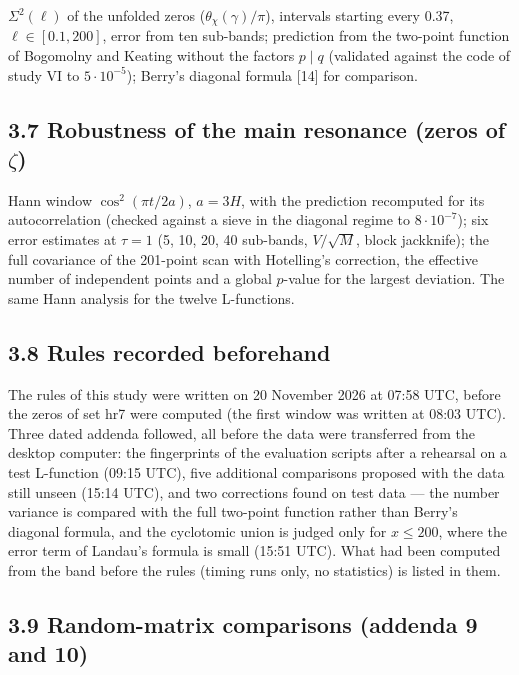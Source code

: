\documentclass[
  10pt,
]{article}
\begin{document}
\(\Sigma^2(\ell)\) of the unfolded zeros (\(\theta_\chi(\gamma)/\pi\)),
intervals starting every 0.37, \(\ell \in [0.1, 200]\), error from ten
sub-bands; prediction from the two-point function of Bogomolny and
Keating without the factors \(p \mid q\) (validated against the code of
study VI to \(5\cdot10^{-5}\)); Berry's diagonal formula {[}14{]} for
comparison.

\hypertarget{robustness-of-the-main-resonance-zeros-of-zeta}{%
\subsection{\texorpdfstring{3.7 Robustness of the main resonance (zeros
of
\(\zeta\))}{3.7 Robustness of the main resonance (zeros of \textbackslash zeta)}}\label{robustness-of-the-main-resonance-zeros-of-zeta}}

Hann window \(\cos^2(\pi t/2a)\), \(a = 3H\), with the prediction
recomputed for its autocorrelation (checked against a sieve in the
diagonal regime to \(8\cdot10^{-7}\)); six error estimates at
\(\tau = 1\) (5, 10, 20, 40 sub-bands, \(V/\sqrt M\), block jackknife);
the full covariance of the 201-point scan with Hotelling's correction,
the effective number of independent points and a global \(p\)-value for
the largest deviation. The same Hann analysis for the twelve
L-functions.

\hypertarget{rules-recorded-beforehand}{%
\subsection{3.8 Rules recorded
beforehand}\label{rules-recorded-beforehand}}

The rules of this study were written on 20 November 2026 at 07:58 UTC,
before the zeros of set hr7 were computed (the first window was written
at 08:03 UTC). Three dated addenda followed, all before the data were
transferred from the desktop computer: the fingerprints of the
evaluation scripts after a rehearsal on a test L-function (09:15 UTC),
five additional comparisons proposed with the data still unseen (15:14
UTC), and two corrections found on test data --- the number variance is
compared with the full two-point function rather than Berry's diagonal
formula, and the cyclotomic union is judged only for \(x \le 200\),
where the error term of Landau's formula is small (15:51 UTC). What had
been computed from the band before the rules (timing runs only, no
statistics) is listed in them.

\hypertarget{random-matrix-comparisons-addenda-9-and-10}{%
\subsection{3.9 Random-matrix comparisons (addenda 9 and
10)}\label{random-matrix-comparisons-addenda-9-and-10}}
\end{document}
